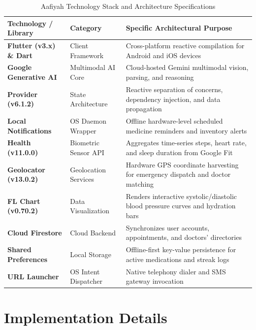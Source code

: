 \documentclass[12pt,a4paper,oneside]{report}
\begin{document}
\begin{table}[htbp]
\centering
\caption{Aafiyah Technology Stack and Architecture Specifications}
\label{tab:tech_stack_en}
\begin{tabularx}{\textwidth}{L{4.2cm} L{3.5cm} X}
\toprule
\textbf{Technology / Library} & \textbf{Category} & \textbf{Specific Architectural Purpose} \\
\midrule
\textbf{Flutter (v3.x) \& Dart} & Client Framework & Cross-platform reactive compilation for Android and iOS devices \\
\textbf{Google Generative AI} & Multimodal AI Core & Cloud-hosted Gemini multimodal vision, parsing, and reasoning \\
\textbf{Provider (v6.1.2)} & State Architecture & Reactive separation of concerns, dependency injection, and data propagation \\
\textbf{Local Notifications} & OS Daemon Wrapper & Offline hardware-level scheduled medicine reminders and inventory alerts \\
\textbf{Health (v11.0.0)} & Biometric Sensor API & Aggregates time-series steps, heart rate, and sleep duration from Google Fit \\
\textbf{Geolocator (v13.0.2)} & Geolocation Services & Hardware GPS coordinate harvesting for emergency dispatch and doctor matching \\
\textbf{FL Chart (v0.70.2)} & Data Visualization & Renders interactive systolic/diastolic blood pressure curves and hydration bars \\
\textbf{Cloud Firestore} & Cloud Backend & Synchronizes user accounts, appointments, and doctors' directories \\
\textbf{Shared Preferences} & Local Storage & Offline-first key-value persistence for active medications and streak logs \\
\textbf{URL Launcher} & OS Intent Dispatcher & Native telephony dialer and SMS gateway invocation \\
\bottomrule
\end{tabularx}
\end{table}

\chapter{Implementation Details}
\end{document}
